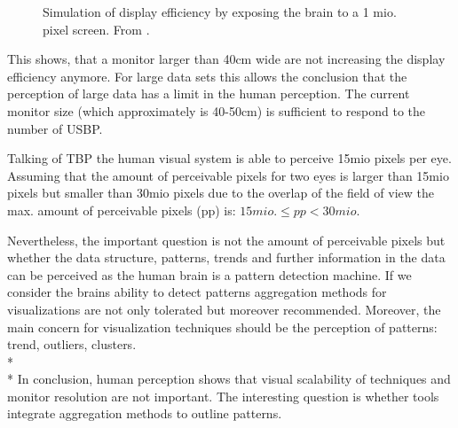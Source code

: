\begin{figure}[H]
    \centering
    \caption{Simulation of display efficiency by exposing the brain to a 1 mio. pixel screen. From \cite{Ware2012a}.}
    \label{fig:DE}
\end{figure}

This shows, that a monitor larger than 40cm wide are not increasing the display efficiency anymore. For large data sets this allows the conclusion that the perception of large data has a limit in the human perception. The current monitor size (which approximately is  40-50cm) is sufficient to respond to the number of USBP.

Talking of TBP  the human visual system is able to perceive 15mio pixels per eye\cite{Deering1998}. Assuming that the amount of perceivable pixels for two eyes is larger than 15mio pixels but smaller than 30mio pixels due to the overlap of the field of view the max. amount of perceivable pixels (pp) is:
\begin{math}
15 mio. \leq pp < 30 mio.
\end{math}

Nevertheless, the important question is not the amount of perceivable pixels but whether the data structure, patterns, trends and further information in the data can be perceived as the human brain is a pattern detection machine\cite{Ware2012a}. If we consider the brains ability to detect patterns aggregation methods for visualizations are not only tolerated but moreover recommended. Moreover, the main concern for visualization techniques should be the perception of patterns: trend, outliers, clusters. 
\\*
\\*
In conclusion, human perception shows that visual scalability of techniques and monitor resolution are not important. The interesting question is whether tools integrate aggregation methods to outline patterns.

